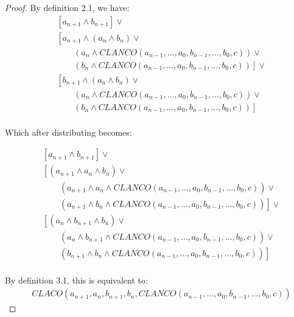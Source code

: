 \documentclass{article}
\begin{document}
\begin{proof}
	       By definition 2.1, we have: \\
	       
	       \begin{align*}
	       & \left[a_{n+1} \land b_{n+1} \right] \lor \\ 
	       	& \left[ a_{n+1} \land (a_{n} \land b_{n}) \lor \right. \\  
	      	&\qquad (a_{n} \land CLANCO(a_{n-1}, \ldots, a_0, b_{n-1}, \ldots, b_0, c)) \lor \\
	       &\qquad \left.  (b_{n} \land CLANCO(a_{n-1}, \ldots, a_0, b_{n-1}, \ldots, b_0, c))\right] \lor \\ 
	       	&  \left[ b_{n+1} \land (a_{n} \land b_{n}) \lor \right. \\  
	       	&\qquad (a_{n} \land CLANCO(a_{n-1}, \ldots, a_0, b_{n-1}, \ldots, b_0, c)) \lor \\
	       &\qquad \left. (b_{n} \land CLANCO(a_{n-1}, \ldots, a_0, b_{n-1}, \ldots, b_0, c)) \right] \\
	       \end{align*}

	      Which after distributing becomes:
	      
	      \begin{align*}
	      	& \left[a_{n+1} \land b_{n+1} \right] \lor \\ 
	      	& \left[ (a_{n+1} \land a_{n} \land b_{n}) \lor \right. \\  
	      	&\qquad (a_{n+1} \land a_{n} \land CLANCO(a_{n-1}, \ldots, a_0, b_{n-1}, \ldots, b_0, c)) \lor \\
	      	&\qquad \left.  (a_{n+1} \land b_{n} \land CLANCO(a_{n-1}, \ldots, a_0, b_{n-1}, \ldots, b_0, c))\right] \lor \\ 
	      	&  \left[ (a_{n} \land b_{n+1} \land b_{n}) \lor \right. \\  
	      	&\qquad (a_{n} \land b_{n+1} \land CLANCO(a_{n-1}, \ldots, a_0, b_{n-1}, \ldots, b_0, c)) \lor \\
	      	&\qquad \left. (b_{n+1} \land b_{n} \land CLANCO(a_{n-1}, \ldots, a_0, b_{n-1}, \ldots, b_0, c)) \right] \\
	      \end{align*}
	      
	      By definition 3.1, this is equivalent to: \\
	      \begin{align*}
	      		 & CLACO(a_{n+1}, a_n, b_{n+1}, b_n, CLANCO(a_{n-1}, \ldots, a_0, b_{n-1}, \ldots, b_0, c)) 
	      \end{align*}
	      

\end{proof}
\end{document}
